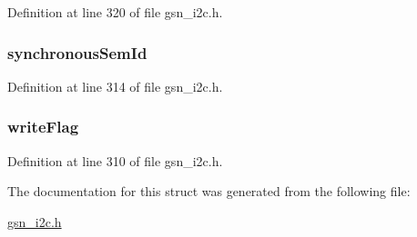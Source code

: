 Definition at line 320 of file gsn\_\-i2c.h.

\hypertarget{a00098_a9fe2614928fcf7fb1cd481dea841923d}{
\subsubsection[{synchronousSemId}]{ {\bf synchronousSemId}}}
\label{a00098_a9fe2614928fcf7fb1cd481dea841923d}


Definition at line 314 of file gsn\_\-i2c.h.

\hypertarget{a00098_a549205d9ecbb1ed7a82528163952fd6c}{
\subsubsection[{writeFlag}]{ {\bf writeFlag}}}
\label{a00098_a549205d9ecbb1ed7a82528163952fd6c}


Definition at line 310 of file gsn\_\-i2c.h.



The documentation for this struct was generated from the following file:\begin{DoxyCompactItemize}
\item 
\hyperlink{a00516}{gsn\_\-i2c.h}\end{DoxyCompactItemize}
